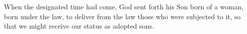 \lettrine[lines=3]{W}{}hen the designated time had come, God sent forth his Son born of a woman, born under the law, to deliver from the law those who were subjected to it, so that we might receive our status as adopted sons.
